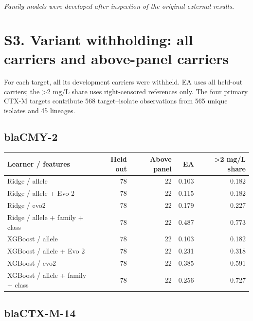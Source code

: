 \documentclass[
  10pt,
]{article}
\newcounter{none} %
\begin{document}
\emph{Family models were developed after inspection of the original
external results.}

\section{S3. Variant withholding: all carriers and above-panel
carriers}\label{s3.-variant-withholding-all-carriers-and-above-panel-carriers}

For each target, all its development carriers were withheld. EA uses all
held-out carriers; the \textgreater2 mg/L share uses right-censored
references only. The four primary CTX-M targets contribute 568
target--isolate observations from 565 unique isolates and 45 lineages.

\subsection{blaCMY-2}\label{blacmy-2}

{\def\LTcaptype{none} %
\begin{longtable}[]{@{}lrrrr@{}}
\toprule\noalign{}
Learner / features & Held out & Above panel & EA & \textgreater2 mg/L
share \\
\midrule\noalign{}
\endhead
\bottomrule\noalign{}
\endlastfoot
Ridge / allele & 78 & 22 & 0.103 & 0.182 \\
Ridge / allele + Evo 2 & 78 & 22 & 0.115 & 0.182 \\
Ridge / evo2 & 78 & 22 & 0.179 & 0.227 \\
Ridge / allele + family + class & 78 & 22 & 0.487 & 0.773 \\
XGBoost / allele & 78 & 22 & 0.103 & 0.182 \\
XGBoost / allele + Evo 2 & 78 & 22 & 0.231 & 0.318 \\
XGBoost / evo2 & 78 & 22 & 0.385 & 0.591 \\
XGBoost / allele + family + class & 78 & 22 & 0.256 & 0.727 \\
\end{longtable}
}

\subsection{blaCTX-M-14}\label{blactx-m-14}
\end{document}
